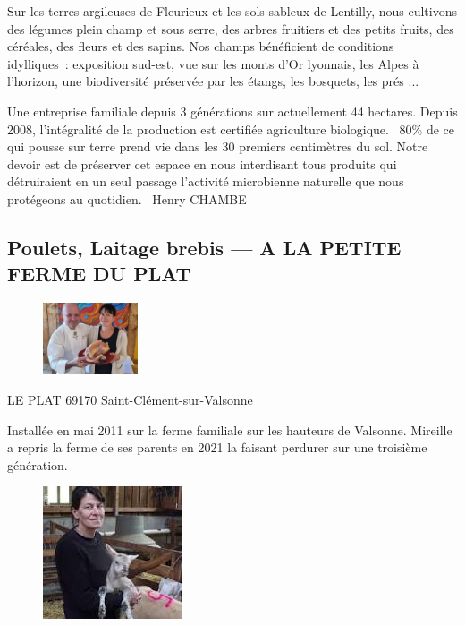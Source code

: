 \documentclass[10pt,a4paper,french]{article}
\makeatletter
\newcommand{\authoredby}[1]{\addtocontents{toc}{\protect\@nameuse{authoredby#1}}}%
\makeatother
\begin{document}
\noindent Sur les terres argileuses de Fleurieux et les sols sableux
de Lentilly, nous cultivons des légumes plein champ et sous serre, des
arbres fruitiers et des petits fruits, des céréales, des fleurs et des
sapins. Nos champs bénéficient de conditions idylliques\ : exposition
sud-est, vue sur les monts d'Or lyonnais, les Alpes à l'horizon, une
biodiversité préservée par les étangs, les bosquets, les prés ...\newline

\noindent Une entreprise familiale depuis 3 générations sur
actuellement 44 hectares. Depuis 2008, l'intégralité de la production
est certifiée agriculture biologique. \guillemotleft\ 80\% de ce qui
pousse sur terre prend vie dans les 30 premiers centimètres du
sol. Notre devoir est de préserver cet espace en nous interdisant tous
produits qui détruiraient en un seul passage l'activité microbienne
naturelle que nous protégeons au quotidien. \guillemotright\ Henry
CHAMBE

\newpage

\authoredby{B}
\subsection{Poulets, Laitage brebis --- A LA PETITE FERME DU PLAT}\label{subsec:poulets}

\begin{figure}
\includegraphics[width=0.25\textwidth]{GRILLET1.jpg}
\end{figure}

\newline
LE PLAT 69170 Saint-Clément-sur-Valsonne\newline

\noindent Installée en mai 2011 sur la ferme familiale sur les
hauteurs de Valsonne. Mireille a repris la ferme de ses parents en
2021 la faisant perdurer sur une troisième génération.\newline

\vspace{3em}

\begin{figure}
\includegraphics[height=0.2\textwidth]{GRILLET2.jpg}
\end{figure}
\end{document}
